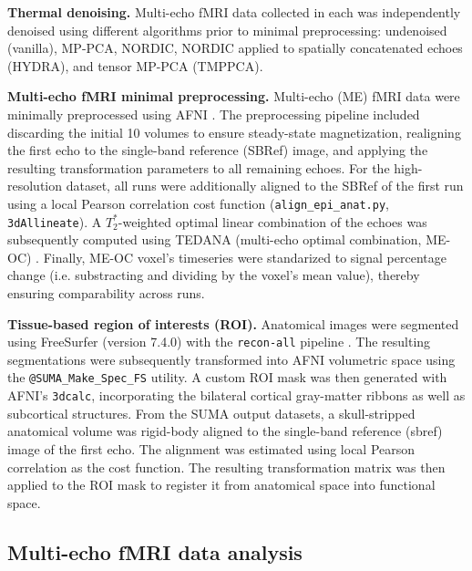 \textbf{Thermal denoising.} Multi-echo fMRI data collected in each was independently denoised using different algorithms prior to minimal preprocessing: undenoised (vanilla), MP-PCA, NORDIC, NORDIC applied to spatially concatenated echoes (HYDRA), and tensor MP-PCA (TMPPCA).

\textbf{Multi-echo fMRI minimal preprocessing.} Multi-echo (ME) fMRI data were minimally preprocessed using AFNI \citep{cox1996afni}. The preprocessing pipeline included discarding the initial 10 volumes to ensure steady-state magnetization, realigning the first echo to the single-band reference (SBRef) image, and applying the resulting transformation parameters to all remaining echoes. For the high-resolution dataset, all runs were additionally aligned to the SBRef of the first run using a local Pearson correlation cost function (\texttt{align\_epi\_anat.py}, \texttt{3dAllineate}). A $T_2^*$-weighted optimal linear combination of the echoes was subsequently computed using TEDANA (multi-echo optimal combination, ME-OC) \citep{posse1999enhancement,dupre2021te}.  Finally, ME-OC voxel's timeseries were standarized to signal percentage change (i.e. substracting and dividing by the voxel's mean value), thereby ensuring comparability across runs.  
 
\textbf{Tissue-based region of interests (ROI).} Anatomical images were segmented using FreeSurfer (version 7.4.0) with the \texttt{recon-all} pipeline \citep{fischl2004automatically}. The resulting segmentations were subsequently transformed into AFNI volumetric space using the \texttt{@SUMA\_Make\_Spec\_FS} utility. A custom ROI mask was then generated with AFNI’s \texttt{3dcalc}, incorporating the bilateral cortical gray-matter ribbons as well as subcortical structures. From the SUMA output datasets, a skull-stripped anatomical volume was rigid-body aligned to the single-band reference (sbref) image of the first echo. The alignment was estimated using local Pearson correlation as the cost function. The resulting transformation matrix was then applied to the ROI mask to register it from anatomical space into functional space. 

\subsection{Multi-echo fMRI data analysis}

